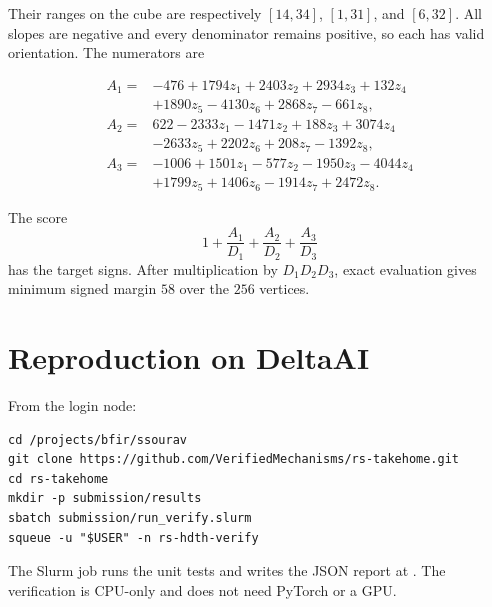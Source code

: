 \documentclass[10pt]{article}
\theoremstyle{definition}
\theoremstyle{remark}
\begin{document}
Their ranges on the cube are respectively $[14,34]$, $[1,31]$, and $[6,32]$.
All slopes are negative and every denominator remains positive, so each has valid
orientation. The numerators are

\begin{align*}
A_1={}&-476+1794z_1+2403z_2+2934z_3+132z_4\\
&+1890z_5-4130z_6+2868z_7-661z_8,\\
A_2={}&622-2333z_1-1471z_2+188z_3+3074z_4\\
&-2633z_5+2202z_6+208z_7-1392z_8,\\
A_3={}&-1006+1501z_1-577z_2-1950z_3-4044z_4\\
&+1799z_5+1406z_6-1914z_7+2472z_8.
\end{align*}

The score
\[
1+\frac{A_1}{D_1}+\frac{A_2}{D_2}+\frac{A_3}{D_3}
\]
has the target signs. After multiplication by $D_1D_2D_3$, exact evaluation gives
minimum signed margin $58$ over the $256$ vertices.

\section{Reproduction on DeltaAI}

From the login node:

\begin{verbatim}
cd /projects/bfir/ssourav
git clone https://github.com/VerifiedMechanisms/rs-takehome.git
cd rs-takehome
mkdir -p submission/results
sbatch submission/run_verify.slurm
squeue -u "$USER" -n rs-hdth-verify
\end{verbatim}

The Slurm job runs the unit tests and writes the JSON report at
.
The verification is CPU-only and does not need PyTorch or a GPU.
\end{document}
